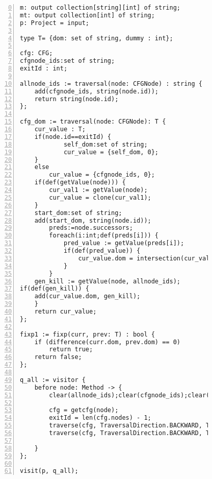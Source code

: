 \begin{figure}[ht!]
\begin{lstlisting}[numbers=left, tabsize=4, escapechar=@, caption={Post Dominator analysis},label={lst:post-dominator-code},firstline=0, firstnumber=0, lastline = 55] 
m: output collection[string][int] of string;
mt: output collection[int] of string;
p: Project = input;

type T= {dom: set of string, dummy : int};
	
cfg: CFG;
cfgnode_ids:set of string;
exitId : int;

allnode_ids := traversal(node: CFGNode) : string {
	add(cfgnode_ids, string(node.id));
	return string(node.id);
};

cfg_dom := traversal(node: CFGNode): T {
	cur_value : T;
	if(node.id==exitId) {
			self_dom:set of string;
			cur_value = {self_dom, 0};
	}
	else
		cur_value = {cfgnode_ids, 0};
	if(def(getValue(node))) {
		cur_val1 := getValue(node);
		cur_value = clone(cur_val1);
	}
	start_dom:set of string;
	add(start_dom, string(node.id));
		preds:=node.successors;
		foreach(i:int;def(preds[i])) {
			pred_value := getValue(preds[i]);
			if(def(pred_value)) {
				cur_value.dom = intersection(cur_value.dom,pred_value.dom);
			}
		}	
	gen_kill := getValue(node, allnode_ids);
if(def(gen_kill)) {
	add(cur_value.dom, gen_kill);
	}
	return cur_value;
};

fixp1 := fixp(curr, prev: T) : bool {
 	if (difference(curr.dom, prev.dom) == 0)
 		return true;	
 	return false;
};

q_all := visitor {
	before node: Method -> {
		clear(allnode_ids);clear(cfgnode_ids);clear(cfg_dom);

		cfg = getcfg(node);
		exitId = len(cfg.nodes) - 1;
		traverse(cfg, TraversalDirection.BACKWARD, TraversalKind.HYBRID, allnode_ids);
		traverse(cfg, TraversalDirection.BACKWARD, TraversalKind.HYBRID, cfg_dom, fixp1);
		
	}
};

visit(p, q_all);

\end{lstlisting}
\end{figure}